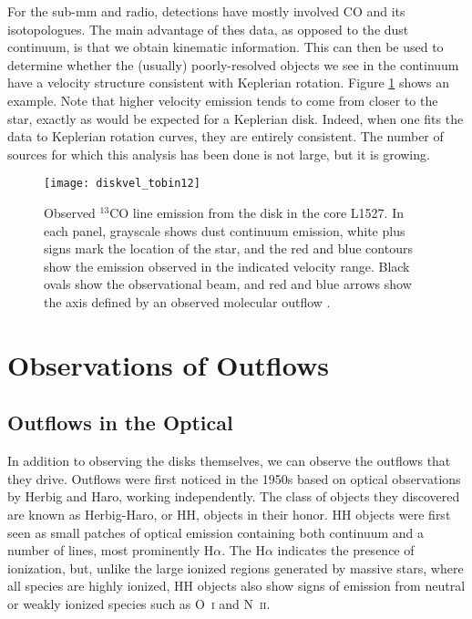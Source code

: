For the sub-mm and radio, detections have mostly involved CO and its isotopologues. The main advantage of thes data, as opposed to the dust continuum, is that we obtain kinematic information. This can then be used to determine whether the (usually) poorly-resolved objects we see in the continuum have a velocity structure consistent with Keplerian rotation.  Figure \ref{fig:diskvel_tobin12} shows an example. Note that higher velocity emission tends to come from closer to the star, exactly as would be expected for a Keplerian disk. Indeed, when one fits the data to Keplerian rotation curves, they are entirely consistent. The number of sources for which this analysis has been done is not large, but it is growing.

\begin{figure}
\texttt{[image: diskvel\_tobin12]}
\caption[$^{13}$CO channel maps of the disk in L1527]{
\label{fig:diskvel_tobin12}
Observed $^{13}$CO line emission from the disk in the core L1527. In each panel, grayscale shows dust continuum emission, white plus signs mark the location of the star, and the red and blue contours show the emission observed in the indicated velocity range. Black ovals show the observational beam, and red and blue arrows show the axis defined by an observed molecular outflow \citep{tobin12a}.
}
\end{figure}



\section{Observations of Outflows}

\subsection{Outflows in the Optical}

In addition to observing the disks themselves, we can observe the outflows that they drive. Outflows were first noticed in the 1950s based on optical observations by Herbig and Haro, working independently. The class of objects they discovered are known as Herbig-Haro, or HH, objects in their honor. HH objects were first seen as small patches of optical emission containing both continuum and a number of lines, most prominently H$\alpha$. The H$\alpha$ indicates the presence of ionization, but, unlike the large ionized regions generated by massive stars, where all species are highly ionized, HH objects also show signs of emission from neutral or weakly ionized species such as O~\textsc{i} and N~\textsc{ii}.

